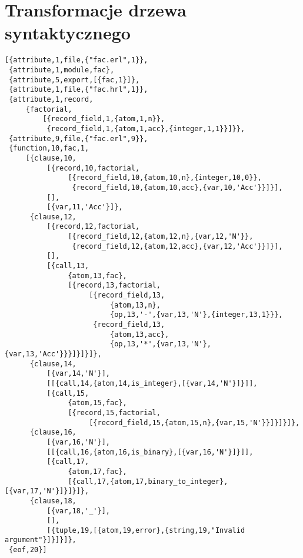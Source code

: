 \section{Transformacje drzewa syntaktycznego}
\begin{lstlisting}[style=erlang, caption=Drzewo syntaktyczne modułu fac, label=facAE]
[{attribute,1,file,{"fac.erl",1}},
 {attribute,1,module,fac},
 {attribute,5,export,[{fac,1}]},
 {attribute,1,file,{"fac.hrl",1}},
 {attribute,1,record,
     {factorial,
         [{record_field,1,{atom,1,n}},
          {record_field,1,{atom,1,acc},{integer,1,1}}]}},
 {attribute,9,file,{"fac.erl",9}},
 {function,10,fac,1,
     [{clause,10,
          [{record,10,factorial,
               [{record_field,10,{atom,10,n},{integer,10,0}},
                {record_field,10,{atom,10,acc},{var,10,'Acc'}}]}],
          [],
          [{var,11,'Acc'}]},
      {clause,12,
          [{record,12,factorial,
               [{record_field,12,{atom,12,n},{var,12,'N'}},
                {record_field,12,{atom,12,acc},{var,12,'Acc'}}]}],
          [],
          [{call,13,
               {atom,13,fac},
               [{record,13,factorial,
                    [{record_field,13,
                         {atom,13,n},
                         {op,13,'-',{var,13,'N'},{integer,13,1}}},
                     {record_field,13,
                         {atom,13,acc},
                         {op,13,'*',{var,13,'N'},{var,13,'Acc'}}}]}]}]},
      {clause,14,
          [{var,14,'N'}],
          [[{call,14,{atom,14,is_integer},[{var,14,'N'}]}]],
          [{call,15,
               {atom,15,fac},
               [{record,15,factorial,
                    [{record_field,15,{atom,15,n},{var,15,'N'}}]}]}]},
      {clause,16,
          [{var,16,'N'}],
          [[{call,16,{atom,16,is_binary},[{var,16,'N'}]}]],
          [{call,17,
               {atom,17,fac},
               [{call,17,{atom,17,binary_to_integer},[{var,17,'N'}]}]}]},
      {clause,18,
          [{var,18,'_'}],
          [],
          [{tuple,19,[{atom,19,error},{string,19,"Invalid argument"}]}]}]},
 {eof,20}]
\end{lstlisting}
